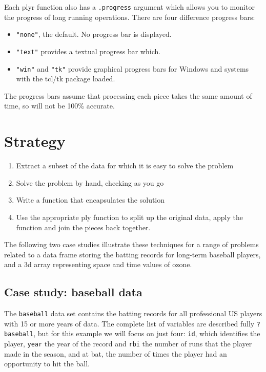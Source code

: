 \documentclass[letterpaper,oneside]{scrartcl}
\begin{document}
Each plyr function also has a {\tt .progress} argument which allows you to monitor the progress of long running operations.  There are four difference progress bars:

\begin{itemize}
  \item {\tt "none"}, the default.  No progress bar is displayed.
  \item {\tt "text"} provides a textual progress bar which.
  \item {\tt "win"} and {\tt "tk"} provide graphical progress bars for Windows and systems with the tcl/tk package loaded.
\end{itemize}

The progress bars assume that processing each piece takes the same amount of time, so will not be 100\% accurate.

\section{Strategy}
\label{sec:strategy}



\begin{enumerate}
  \item Extract a subset of the data for which it is easy to solve the problem
  \item Solve the problem by hand, checking as you go
  \item Write a function that encapsulates the solution
  \item Use the appropriate ply function to split up the original data, apply the function and join the pieces back together.
  
\end{enumerate}

The following two case studies illustrate these techniques for a range of problems related to a data frame storing the batting records for long-term baseball players, and a 3d array representing space and time values of ozone.

\subsection{Case study: baseball data}

The {\tt baseball} data set contains the batting records for all professional US players with 15 or more years of data.  The complete list of variables are described fully {\tt ?baseball}, but for this example we will focus on just four: {\tt id}, which identifies the player, {\tt year} the year of the record and {\tt rbi} the number of runs that the player made in the season, and {\tt} at bat, the number of times the player had an opportunity to hit the ball.
\end{document}

